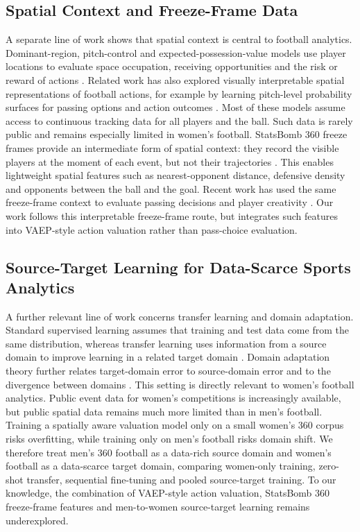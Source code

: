 \documentclass[runningheads]{llncs}
\begin{document}
\subsection{Spatial Context and Freeze-Frame Data}
A separate line of work shows that spatial context is central to football analytics. Dominant-region, pitch-control and expected-possession-value models use player locations to evaluate space occupation, receiving opportunities and the risk or reward of actions \cite{taki2000dominant,spearman2018beyond,power2017passes,fernandez2018wide,fernandez2021framework}. Related work has also explored visually interpretable spatial representations of football actions, for example by learning pitch-level probability surfaces for passing
options and action outcomes \cite{fernandez2021soccermap}.
Most of these models assume access to continuous tracking data for all players and the ball. Such data is rarely public and remains especially limited in women's football. StatsBomb 360 freeze frames provide an intermediate form of spatial context: they record the visible players at the moment of each event, but not their trajectories \cite{statsbomb2021freezeframe}. This enables lightweight spatial features such as nearest-opponent distance,  defensive density and opponents between the ball and the goal. Recent work has used the same freeze-frame context to evaluate passing decisions and player creativity \cite{robberechts2023unxpass}. Our work follows this interpretable freeze-frame route, but integrates such features into VAEP-style action valuation rather than pass-choice evaluation.
\subsection{Source-Target Learning for Data-Scarce Sports Analytics}
A further relevant line of work concerns transfer learning and domain adaptation. Standard supervised learning assumes that training and test data come from the same distribution, whereas transfer learning uses information from a source domain to improve learning in a related target domain \cite{pan2010survey}. Domain adaptation theory further relates target-domain error to source-domain error and to the divergence between domains \cite{bendavid2010theory}.
This setting is directly relevant to women's football analytics. Public event data for women's competitions is increasingly available, but public spatial data remains much more limited than in men's football. Training a spatially aware valuation model only on a small women's 360 corpus risks overfitting, while training only on men's football risks domain shift. We therefore treat men's 360 football as a data-rich source domain and women's football as a data-scarce target domain, comparing women-only training, zero-shot transfer, sequential fine-tuning and pooled source-target training. To our knowledge, the combination of VAEP-style action valuation, StatsBomb 360 freeze-frame features and men-to-women source-target learning remains underexplored.
\end{document}
